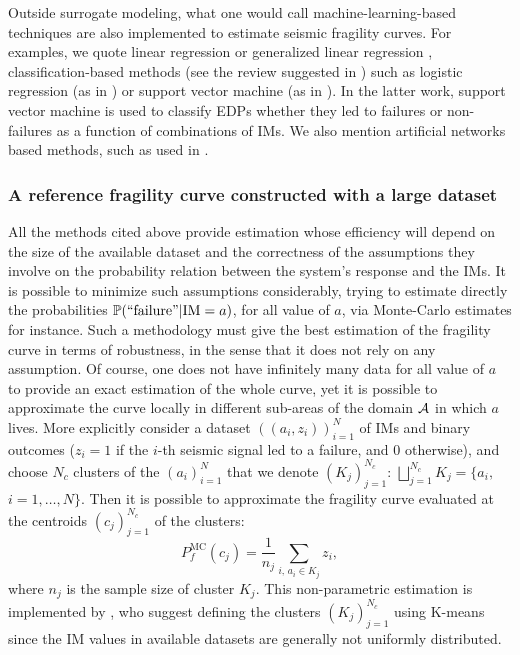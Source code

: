 Outside surrogate modeling, what one would call machine-learning-based techniques are also implemented to estimate seismic fragility curves.
For examples, we quote linear regression or generalized linear regression \citep{lallemant_statistical_2015}, classification-based methods (see the review suggested in \cite{kiani_application_2019}) such as  logistic regression (as in \cite{bernier_fragility_2019}) or support vector machine (as in \cite{sainct_efficient_2020}). In the latter work, support vector machine is used to classify EDPs whether they led to failures or non-failures as a function of combinations of IMs.
We also mention artificial networks based methods, such as used in \cite{mitropoulou_developing_2011,wang_seismic_2018}.
 


\subsubsection{A reference fragility curve constructed with a large dataset}

All the methods cited above provide estimation whose efficiency will depend on the size of the available dataset and the correctness of the assumptions they involve on the probability relation between the system's response and the IMs.
It is possible to minimize such assumptions considerably, trying to estimate directly the probabilities $\mathbb{P}(\text{``failure''}|\text{IM}=a)$, for all value of $a$, via Monte-Carlo estimates for instance.
Such a methodology must give the best estimation of the fragility curve in terms of robustness, in the sense that it does not rely on any assumption. Of course, one does not have infinitely many data for all value of $a$ to provide an exact estimation of the whole curve, yet it is possible to approximate the curve locally in different sub-areas of the domain $\mathcal{A}$ in which $a$ lives.
More explicitly consider a dataset $((a_i,z_i))_{i=1}^{N}$ of IMs and binary outcomes ($z_i=1$ if the $i$-th seismic signal led to a failure, and $0$ otherwise), and choose $N_c$ clusters of the $(a_i)_{i=1}^N$ that we denote $(K_j)_{j=1}^{N_c}$: $\bigsqcup_{j=1}^{N_c}K_j=\{a_i,$ $i=1,\dots,N\}$. Then it is possible to approximate the fragility curve evaluated at the centroids $(c_j)_{j=1}^{N_c}$ of the clusters:
    \begin{equation}
        P_f^{\text{MC}}(c_j) = \frac{1}{n_j}\sum_{i,\, a_i\in K_j}z_i,
    \end{equation}
where $n_j$ is the sample size of cluster $K_j$.
This non-parametric estimation is implemented by \citet{trevlopoulos_parametric_2019}, who suggest defining the clusters $(K_j)_{j=1}^{N_c}$ using K-means since the IM values in available datasets are generally not uniformly distributed.

